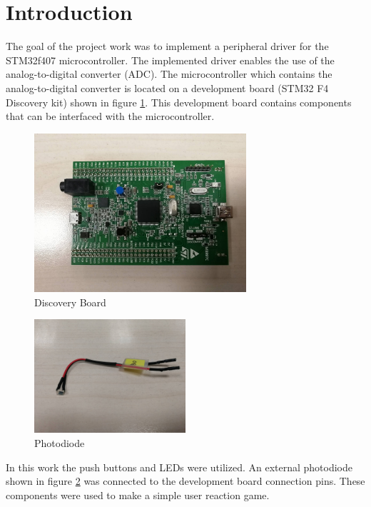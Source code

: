 \section{Introduction}
The goal of the project work was to implement a peripheral driver for the STM32f407 microcontroller. The implemented driver enables the use of the analog-to-digital converter (ADC). The microcontroller which contains the analog-to-digital converter is located on a development board (STM32 F4 Discovery kit) shown in figure \ref{fig:Board}. This development board contains components that can be interfaced with the microcontroller.\\

\begin{figure}[htbp]
  \centering
     \includegraphics[width=0.7\textwidth]{./figures/board.jpg}
  \caption{Discovery Board}
  \label{fig:Board}
\end{figure}

\begin{figure}[htbp]
  \centering
     \includegraphics[width=0.5\textwidth]{./figures/photodiode.jpg}
  \caption{Photodiode}
  \label{fig:photodiode}
\end{figure}

\par
In this work the push buttons and LEDs were utilized. An external photodiode shown in figure \ref{fig:photodiode} was connected to the development board connection pins. These components were used to make a simple user reaction game.

